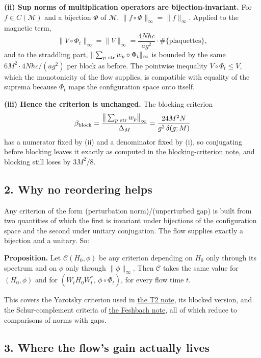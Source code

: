\documentclass[11pt,a4paper]{article}
\begin{document}
\textbf{(ii) Sup norms of multiplication operators are
bijection-invariant.} For \(f\in C(\mathcal M)\) and a bijection
\(\Phi\) of \(\mathcal M\), \(\|f\circ\Phi\|_\infty=\|f\|_\infty\).
Applied to the magnetic term,
\[\big\|V\circ\Phi_t\big\|_\infty=\big\|V\big\|_\infty
=\frac{4N\hbar c}{ag^2}\cdot\#\{\text{plaquettes}\},\] and to the
straddling part, \(\|\sum_{p\ \rm str}w_p\circ\Phi_t\|_\infty\) is
bounded by the same \(6M^2\cdot4N\hbar c/(ag^2)\) per block as before.
The pointwise inequality \(V\circ\Phi_t\le V\), which the monotonicity
of the flow supplies, is compatible with equality of the suprema because
\(\Phi_t\) maps the configuration space onto itself.

\textbf{(iii) Hence the criterion is unchanged.} The blocking criterion
\[\beta_{\rm block}=\frac{\big\|\sum_{p\ \rm str}w_p\big\|_\infty}{\Delta_M}
=\frac{24M^2N}{g^2\,\delta(g;M)}\] has a numerator fixed by (ii) and a
denominator fixed by (i), so conjugating before blocking leaves it
exactly as computed in \href{blocking-criterion-monotone.md}{the
blocking-criterion note}, and blocking still loses by \(3M^2/8\).

\hypertarget{why-no-reordering-helps}{%
\subsection{2. Why no reordering helps}\label{why-no-reordering-helps}}

Any criterion of the form (perturbation norm)/(unperturbed gap) is built
from two quantities of which the first is invariant under bijections of
the configuration space and the second under unitary conjugation. The
flow supplies exactly a bijection and a unitary. So:

\textbf{Proposition.} Let \(\mathcal C(H_0,\phi)\) be any criterion
depending on \(H_0\) only through its spectrum and on \(\phi\) only
through \(\|\phi\|_\infty\). Then \(\mathcal C\) takes the same value
for \((H_0,\phi)\) and for \((W_tH_0W_t^*,\,\phi\circ\Phi_t)\), for
every flow time \(t\).

This covers the Yarotsky criterion used in
\href{strong-coupling-uniform-gap.md}{the T2 note}, its blocked version,
and the Schur-complement criteria of
\href{weak-coupling-feshbach-reduction.md}{the Feshbach note}, all of
which reduce to comparisons of norms with gaps.

\hypertarget{where-the-flows-gain-actually-lives}{%
\subsection{3. Where the flow's gain actually
lives}\label{where-the-flows-gain-actually-lives}}
\end{document}
